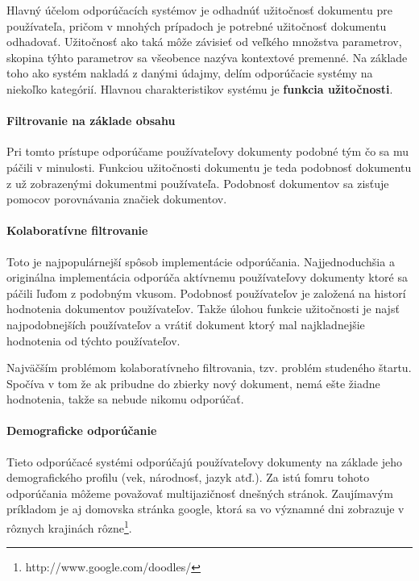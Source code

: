 Hlavný účelom odporúčacích systémov je odhadnúť užitočnosť dokumentu pre
používateľa\cite{recommender_categories}, pričom v mnohých prípadoch
je potrebné užitočnosť dokumentu odhadovať. Užitočnosť ako taká môže závisieť od
veľkého množstva parametrov, skopina týhto parametrov sa všeobence nazýva
kontextové premenné. Na základe toho ako systém nakladá z danými údajmy, 
delím odporúčacie systémy na niekoľko kategórií. Hlavnou charakteristikov systému
je \textbf{funkcia užitočnosti}.

\paragraph{Filtrovanie na základe obsahu}

Pri tomto prístupe odporúčame používateľovy dokumenty podobné tým čo sa mu páčili
v minulosti. Funkciou užitočnosti dokumentu je teda podobnosť dokumentu z už zobrazenými
dokumentmi používateľa. Podobnosť dokumentov sa zisťuje pomocov porovnávania značiek dokumentov.

\paragraph{Kolaboratívne filtrovanie}

Toto je najpopulárnejší spôsob implementácie odporúčania. Najjednoduchšia a originálna 
implementácia odporúča aktívnemu používateľovy dokumenty ktoré sa páčili ľuďom z podobným
vkusom. Podobnosť používateľov je založená na historí hodnotenia dokumentov používateľov.
Takže úlohou funkcie užitočnosti je najsť najpodobnejších používateľov a vrátiť 
dokument ktorý mal najkladnejšie hodnotenia od týchto používateľov.

Najväčším problémom kolaboratívneho filtrovania, tzv. problém studeného štartu. Spočíva v tom
že ak pribudne do zbierky nový dokument, nemá ešte žiadne hodnotenia, takže sa nebude nikomu
odporúčať.

\paragraph{Demograficke odporúčanie}

Tieto odporúčacé systémi odporúčajú používateľovy dokumenty na základe jeho demografického
profilu (vek, národnosť, jazyk atď.). Za istú fomru tohoto odporúčania môžeme považovať
multijazičnosť dnešných stránok. Zaujímavým príkladom je aj domovska stránka google,
ktorá sa vo významné dni zobrazuje v rôznych krajinách
rôzne\footnote{http://www.google.com/doodles/}.

